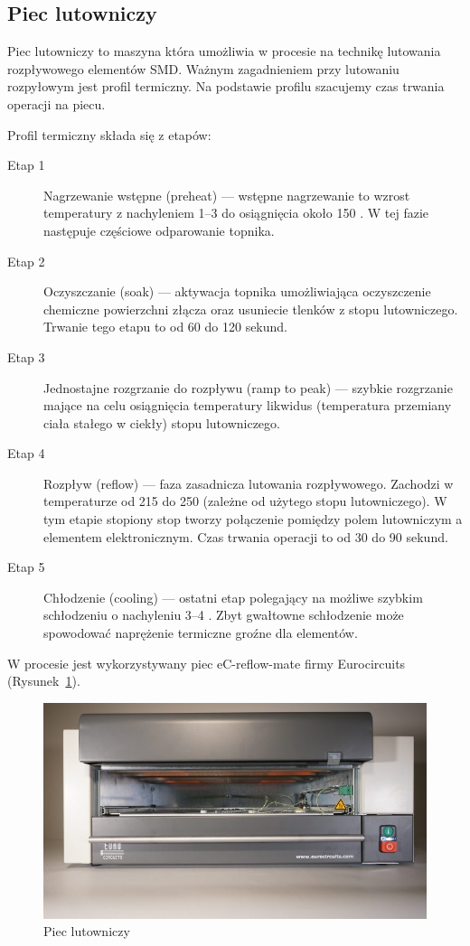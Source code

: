 \subsection{Piec lutowniczy}
Piec lutowniczy to maszyna która umożliwia w procesie na technikę lutowania rozpływowego elementów SMD\@. Ważnym zagadnieniem przy lutowaniu rozpyłowym jest profil termiczny. Na podstawie profilu szacujemy czas trwania operacji na piecu.

Profil termiczny składa się z etapów:
\begin{description}
	\item[Etap 1] Nagrzewanie wstępne (preheat) --- wstępne nagrzewanie to wzrost temperatury z nachyleniem 1--3  do osiągnięcia około 150 . W tej fazie następuje częściowe odparowanie topnika.
	\item[Etap 2] Oczyszczanie (soak) --- aktywacja topnika umożliwiająca oczyszczenie chemiczne powierzchni złącza oraz usuniecie tlenków z stopu lutowniczego. Trwanie tego etapu to od 60 do 120 sekund.
	\item[Etap 3] Jednostajne rozgrzanie do rozpływu (ramp to peak) --- szybkie rozgrzanie mające na celu osiągnięcia temperatury likwidus (temperatura przemiany ciała stałego w ciekły) stopu lutowniczego.
	\item[Etap 4] Rozpływ (reflow) --- faza zasadnicza lutowania rozpływowego. Zachodzi w temperaturze od 215 do 250  (zależne od użytego stopu lutowniczego). W tym etapie stopiony stop tworzy połączenie pomiędzy polem lutowniczym a elementem elektronicznym. Czas trwania operacji to od 30 do 90 sekund.
	\item[Etap 5] Chłodzenie (cooling) --- ostatni etap polegający na możliwe szybkim schłodzeniu o nachyleniu 3--4 . Zbyt gwałtowne schłodzenie może spowodować naprężenie termiczne groźne dla elementów.
\end{description}

W procesie jest wykorzystywany piec eC-reflow-mate firmy Eurocircuits (Rysunek~\ref{piec}).

\begin{figure}[H]
	\centering
	\includegraphics[scale=0.7]{./chapters/chapter2/piec.jpg}
	\caption{Piec lutowniczy}
	\label{piec}
\end{figure}

